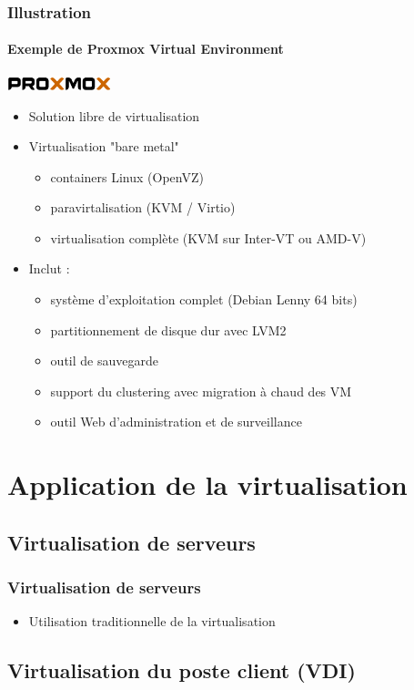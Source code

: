 \begin{frame}
\frametitle{Illustration}
\framesubtitle{Exemple de Proxmox Virtual Environment}
\includegraphics[width=3cm]{../illustration/proxmox_logo.png}
\begin{itemize}
\item Solution libre de virtualisation
\item Virtualisation "bare metal"
\begin{itemize}
\item containers Linux (OpenVZ)
\item paravirtalisation (KVM / Virtio)
\item virtualisation complète (KVM sur Inter-VT ou AMD-V)
\end{itemize}
\item Inclut :
\begin{itemize}
\item système d'exploitation complet (Debian Lenny 64 bits)
\item partitionnement de disque dur avec LVM2
\item outil de sauvegarde 
\item support du clustering avec migration à chaud des VM
\item outil Web d'administration et de surveillance
\end{itemize}
\end{itemize}
\end{frame}

\section{Application de la virtualisation}

\subsection{Virtualisation de serveurs}

\begin{frame}
\frametitle{Virtualisation de serveurs}
\begin{itemize}
\item Utilisation traditionnelle de la virtualisation
\end{itemize}

\end{frame}

\subsection{Virtualisation du poste client (VDI)}

